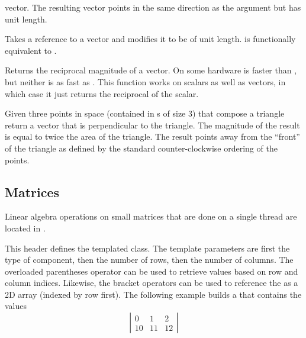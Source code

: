 \begin{description}
  vector. The resulting vector points in the same direction as the argument
  but has unit length.
\item[\vtkm{Normalize}] Takes a reference to a vector and modifies it to
  be of unit length.  is
  functionally equivalent to
  .
\item[\vtkm{RMagnitude}] Returns the reciprocal magnitude of a
  vector. On some hardware  is faster than
  , but neither is as fast as
  . This function works on scalars as well
  as vectors, in which case it just returns the reciprocal of the scalar.
\item[\vtkm{TriangleNormal}] Given three points in space (contained in
  s of size 3) that compose a triangle return a vector that is
  perpendicular to the triangle. The magnitude of the result is equal to
  twice the area of the triangle. The result points away from the ``front''
  of the triangle as defined by the standard counter-clockwise ordering of
  the points.
\end{description}


\subsection{Matrices}
\label{sec:Math:Matrices}


Linear algebra operations on small matrices that are done on a single
thread are located in .

This header defines the  templated class. The template
parameters are first the type of component, then the number of rows, then
the number of columns. The overloaded parentheses operator can be used to
retrieve values based on row and column indices. Likewise, the bracket
operators can be used to reference the  as a 2D
array (indexed by row first). The following example builds a
 that contains the values
\begin{equation*}
  \left|
  \begin{array}{ccc}
    0 & 1 & 2 \\
    10 & 11 & 12
  \end{array}
  \right|
\end{equation*}

